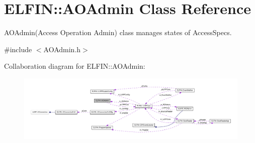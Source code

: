 \hypertarget{class_e_l_f_i_n_1_1_a_o_admin}{\section{E\-L\-F\-I\-N\-:\-:A\-O\-Admin Class Reference}
\label{class_e_l_f_i_n_1_1_a_o_admin}
}


A\-O\-Admin(\-Access Operation Admin) class manages states of Access\-Specs.  




{\ttfamily \#include $<$A\-O\-Admin.\-h$>$}



Collaboration diagram for E\-L\-F\-I\-N\-:\-:A\-O\-Admin\-:
\nopagebreak
\begin{figure}[H]
\begin{center}
\leavevmode
\includegraphics[width=350pt]{class_e_l_f_i_n_1_1_a_o_admin__coll__graph}
\end{center}
\end{figure}

